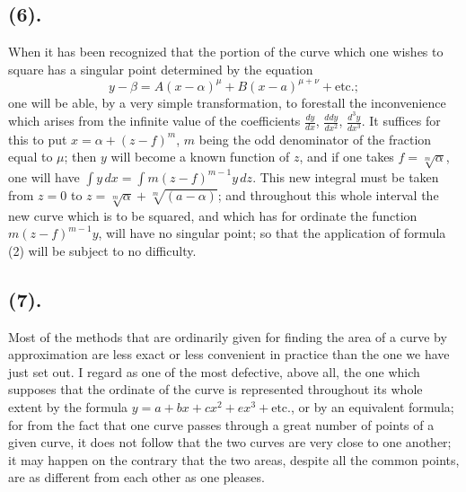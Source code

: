 \documentclass{article}
\begin{document}
\subsection*{(6).}

When it has been recognized that the portion of the curve which one wishes to square has a singular point determined by the equation
\[ y-\beta=A(x-\alpha)^{\mu}+B(x-a)^{\mu+\nu}+\text{etc.}; \]
one will be able, by a very simple transformation, to forestall the inconvenience which arises from the infinite value of the coefficients $\frac{dy}{dx}$, $\frac{ddy}{dx^{2}}$, $\frac{d^{3}y}{dx^{3}}$. It suffices for this to put $x=\alpha+(z-f)^{m}$, $m$ being the odd denominator of the fraction equal to $\mu$; then $y$ will become a known function of $z$, and if one takes $f=\sqrt[m]{\alpha}$, one will have $\displaystyle\int y\,dx=\displaystyle\int m(z-f)^{m-1}y\,dz$. This new integral must be taken from $z=0$ to $z=\sqrt[m]{\alpha}+\sqrt[m]{(a-\alpha)}$; and throughout this whole interval the new curve which is to be squared, and which has for ordinate the function $m(z-f)^{m-1}y$, will have no singular point; so that the application of formula (2) will be subject to no difficulty.

\subsection*{(7).}

Most of the methods that are ordinarily given for finding the area of a curve by approximation are less exact or less convenient in practice than the one we have just set out. I regard as one of the most defective, above all, the one which supposes that the ordinate of the curve is represented throughout its whole extent by the formula $y=a+bx+cx^{2}+ex^{3}+\text{etc.}$, or by an equivalent formula; for from the fact that one curve passes through a great number of points of a given curve, it does not follow that the two curves are very close to one another; it may happen on the contrary that the two areas, despite all the common points, are as different from each other as one pleases.
\end{document}
